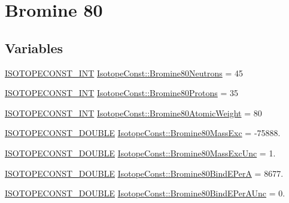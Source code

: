 \hypertarget{group___isotope_const-_bromine-_br80}{}\section{Bromine 80}
\label{group___isotope_const-_bromine-_br80}
\subsection*{Variables}
\begin{DoxyCompactItemize}
\item 
\mbox{\hyperlink{group___isotope_const-_macros_ga5f18360b3e99483a35c32d789e62621c}{I\+S\+O\+T\+O\+P\+E\+C\+O\+N\+S\+T\+\_\+\+I\+NT}} \mbox{\hyperlink{group___isotope_const-_bromine-_br80_ga8b915f8b8d4cd37cf963296dd3164444}{Isotope\+Const\+::\+Bromine80\+Neutrons}} = 45
\item 
\mbox{\hyperlink{group___isotope_const-_macros_ga5f18360b3e99483a35c32d789e62621c}{I\+S\+O\+T\+O\+P\+E\+C\+O\+N\+S\+T\+\_\+\+I\+NT}} \mbox{\hyperlink{group___isotope_const-_bromine-_br80_gae3c11b7094d836504a038fa37feaddff}{Isotope\+Const\+::\+Bromine80\+Protons}} = 35
\item 
\mbox{\hyperlink{group___isotope_const-_macros_ga5f18360b3e99483a35c32d789e62621c}{I\+S\+O\+T\+O\+P\+E\+C\+O\+N\+S\+T\+\_\+\+I\+NT}} \mbox{\hyperlink{group___isotope_const-_bromine-_br80_ga0823618e1a11da476b536db32af9fdab}{Isotope\+Const\+::\+Bromine80\+Atomic\+Weight}} = 80
\item 
\mbox{\hyperlink{group___isotope_const-_macros_ga8f45a7272ce02c0b4c65c44636ed719a}{I\+S\+O\+T\+O\+P\+E\+C\+O\+N\+S\+T\+\_\+\+D\+O\+U\+B\+LE}} \mbox{\hyperlink{group___isotope_const-_bromine-_br80_gafd71e3030727a2eaa5096cdf17df38ea}{Isotope\+Const\+::\+Bromine80\+Mass\+Exc}} = -\/75888.
\item 
\mbox{\hyperlink{group___isotope_const-_macros_ga8f45a7272ce02c0b4c65c44636ed719a}{I\+S\+O\+T\+O\+P\+E\+C\+O\+N\+S\+T\+\_\+\+D\+O\+U\+B\+LE}} \mbox{\hyperlink{group___isotope_const-_bromine-_br80_ga5713be0168c3f8d4ba11adcf6ccc6139}{Isotope\+Const\+::\+Bromine80\+Mass\+Exc\+Unc}} = 1.
\item 
\mbox{\hyperlink{group___isotope_const-_macros_ga8f45a7272ce02c0b4c65c44636ed719a}{I\+S\+O\+T\+O\+P\+E\+C\+O\+N\+S\+T\+\_\+\+D\+O\+U\+B\+LE}} \mbox{\hyperlink{group___isotope_const-_bromine-_br80_gae03c79f66ef6b6e0eecf832bdd45a360}{Isotope\+Const\+::\+Bromine80\+Bind\+E\+PerA}} = 8677.
\item 
\mbox{\hyperlink{group___isotope_const-_macros_ga8f45a7272ce02c0b4c65c44636ed719a}{I\+S\+O\+T\+O\+P\+E\+C\+O\+N\+S\+T\+\_\+\+D\+O\+U\+B\+LE}} \mbox{\hyperlink{group___isotope_const-_bromine-_br80_ga9b6350d75e47fd9f4552301a120c7a9d}{Isotope\+Const\+::\+Bromine80\+Bind\+E\+Per\+A\+Unc}} = 0.

\end{DoxyCompactItemize}
